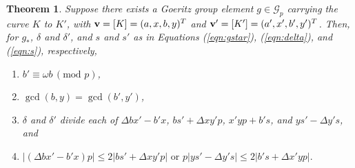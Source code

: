 \documentclass{amsart}     %
\newtheorem{thm}{Theorem}[section]    %
\theoremstyle{definition}
\begin{document}
\begin{thm} \label{thm:linalgobstruction} Suppose there exists a Goeritz group element $g \in \mathcal{G}_p$ carrying the curve $K$ to $K'$, with ${\bf{v}} = [K] = (a, x, b, y)^T$ and ${\bf{v}}' = [K'] = (a', x', b', y')^T$. 
Then, for $g_*$, $\delta$ and $\delta'$, and $s$ and $s'$ as in Equations (\ref{eqn:gstar}), (\ref{eqn:delta}), and (\ref{eqn:s}), respectively,
\begin{enumerate}
\item\label{cond:bcong} $b' \equiv \omega b \, (\mbox{mod }p)$,
\item\label{cond:gcd} $\gcd(b, y) = \gcd(b', y')$,
\item\label{cond:delta} $\delta$ and $\delta'$ divide each of $\Delta bx' - b'x$, $bs' + \Delta xy'p$, $x' y p + b's$, and $ys' - \Delta y's$, and
\item\label{cond:ineqcond} $|(\Delta b x' - b' x)p | \leq 2|bs' + \Delta x y' p| \mbox{ or } p| ys' - \Delta y' s |  \leq  2 | b's + \Delta x'yp |.$
\end{enumerate}
\end{thm}
\end{document}
